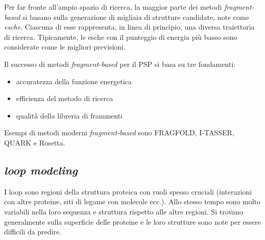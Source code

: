 {Per far fronte all'ampio spazio di ricerca, la maggior parte dei metodi \textit{fragment-based} si basano sulla generazione di migliaia di strutture candidate, note come \textit{esche}. Ciascuna di esse rappresenta, in linea di principio, una diversa traiettoria di ricerca. Tipicamente, le esche con il punteggio di energia più basso sono considerate come le migliori previsioni. 

\par Il successo di metodi \textit{fragment-based} per il PSP si basa su tre fondamenti: 
\begin{itemize}
	\item accuratezza della funzione energetica
	\item efficienza del metodo di ricerca 
	\item qualità della libreria di frammenti
\end{itemize}

Esempi di metodi moderni \textit{fragment-based} sono FRAGFOLD, I-TASSER, QUARK e Rosetta.


\subsection{\textit{loop modeling}} \label{sec: loop-modeling}
{
I loop sono regioni della struttura proteica con ruoli spesso cruciali (interazioni con altre proteine, siti di legame con molecole ecc.). Allo stesso tempo sono molto variabili nella loro sequenza e struttura rispetto alle altre regioni. Si trovano generalmente sulla superficie delle proteine e le loro strutture sono note per essere difficili da predire.

}}
